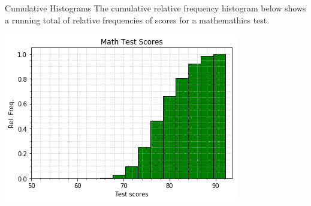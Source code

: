 \documentclass[t]{beamer}
\begin{document}
\begin{frame}{Cumulative Histograms}
The cumulative relative frequency histogram below shows a running total of relative frequencies of scores for a mathemathics test.
\begin{center}
\includegraphics[scale=0.6]{../Images/cumulative_hist.png}
\end{center}
\end{frame}
\end{document}
